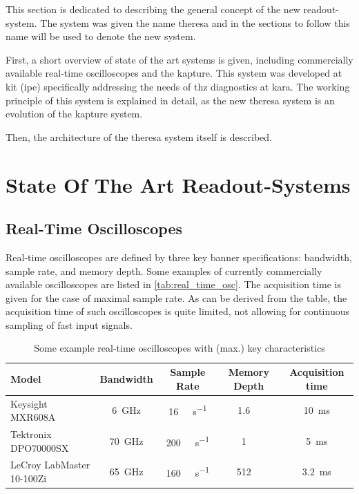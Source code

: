 This section is dedicated to describing the general concept of the new readout-system. 
The system was given the name \gls{theresa} and in the sections to follow  this name will be used to denote the new system.

First, a short overview of state of the art systems is given, including commercially available real-time oscilloscopes and the \gls{kapture}.
This system was developed at \gls{kit} (\gls{ipe}) specifically addressing the needs of \gls{thz} diagnostics at \gls{kara}.
The working principle of this system is explained in detail, as the new \gls{theresa} system is an evolution of the \gls{kapture} system. 

Then, the architecture of the \gls{theresa} system itself is described.

\section{State Of The Art Readout-Systems}

\subsection*{Real-Time Oscilloscopes}
Real-time oscilloscopes are defined by three key banner specifications: bandwidth, sample rate, and memory depth.
Some examples of currently commercially available oscilloscopes are listed in \autoref{tab:real_time_osc}.
The acquisition time is given for the case of maximal sample rate.
As can be derived from the table, the acquisition time of such oscilloscopes is quite limited, not allowing for continuous sampling of fast input signals.
\begin{table}[tbh]
	\caption[Real Time Oscilloscopes Examples]{Some example real-time oscilloscopes with (max.) key characteristics}
	\label{tab:real_time_osc}
	\centering
	\begin{tabularx}{\textwidth}{Xcccc}
		\toprule
		\textbf{Model}            & \textbf{Bandwidth} &         \textbf{Sample Rate}         &  \textbf{Memory Depth}  & \textbf{Acquisition time} \\ \midrule
		Keysight MXR608A          &    \SI{6}{\GHz}    & \SI{16}{\giga \sample \per \second}  & \SI{1.6}{\giga \sample} &  \SI{10}{\milli \second}  \\
		Tektronix DPO70000SX      &   \SI{70}{\GHz}    & \SI{200}{\giga \sample \per \second} &  \SI{1}{\giga \sample}  &  \SI{5}{\milli \second}   \\
		LeCroy LabMaster 10-100Zi &   \SI{65}{\GHz}    & \SI{160}{\giga \sample \per \second} & \SI{512}{\mega \sample} & \SI{3.2}{\milli \second}  \\ \bottomrule
	\end{tabularx}
\end{table}


